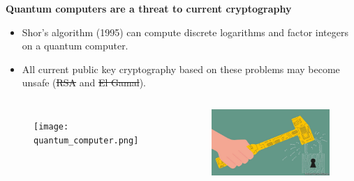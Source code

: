 \documentclass[10pt]{beamer}
\theoremstyle{plain}
\theoremstyle{definition}
\renewcommand{\(}{\left(}
\renewcommand{\)}{\right)}
\begin{document}
\begin{frame}
\textbf{Quantum computers are a threat to current cryptography}

\begin{itemize}
\item Shor's algorithm (1995) can compute discrete logarithms and factor integers on a quantum computer.

\item All current public key cryptography based on these problems may become unsafe (\sout{RSA} and \sout{El Gamal}).
\end{itemize}

\begin{columns}[t]

\begin{figure}
\texttt{[image: quantum\_computer.png]} 

\end{figure}



\begin{figure}
\includegraphics[width=6cm]{hammer.jpeg} 
\end{figure}

\end{columns}

\end{frame}
\end{document}
